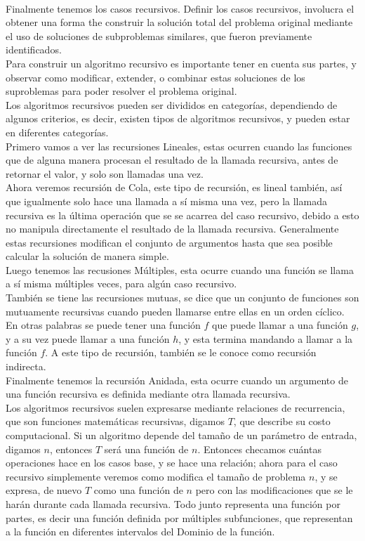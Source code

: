 \documentclass[12pt,twoside]{article}
\begin{document}
\newline
\\ Finalmente tenemos los casos recursivos. Definir los casos recursivos, involucra el obtener una forma the construir la solución total del problema original mediante el uso de soluciones de subproblemas similares, que fueron previamente identificados.
\\ Para construir un algoritmo recursivo es importante tener en cuenta sus partes, y observar como modificar, extender, o combinar estas soluciones de los suproblemas para poder resolver el problema original.
\newline
\\ Los algoritmos recursivos pueden ser divididos en categorías, dependiendo de algunos criterios, es decir, existen tipos de algoritmos recursivos, y pueden estar en diferentes categorías.
\\ Primero vamos a ver las recursiones Lineales, estas ocurren cuando las funciones que de alguna manera procesan el resultado de la llamada recursiva, antes de retornar el valor, y solo son llamadas una vez.
\\ Ahora veremos recursión de Cola, este tipo de recursión, es lineal también, así que igualmente solo hace una llamada a sí misma una vez, pero la llamada recursiva es la última operación que se se acarrea del caso recursivo, debido a esto no manipula directamente el resultado de la llamada recursiva. Generalmente estas recursiones modifican el conjunto de argumentos hasta que sea posible calcular la solución de manera simple.
\\ Luego tenemos las recusiones Múltiples, esta ocurre cuando una función se llama a sí misma múltiples veces, para algún caso recursivo.
\\ También se tiene las recursiones mutuas, se dice que un conjunto de funciones son mutuamente recursivas cuando pueden llamarse entre ellas en un orden cíclico. En otras palabras se puede tener una función $f$ que puede llamar a una función $g$, y a su vez puede llamar a una función $h$, y esta termina mandando a llamar a la función $f$. A este tipo de recursión, también se le conoce como recursión indirecta.
\\ Finalmente tenemos la recursión Anidada, esta ocurre cuando un argumento de una función recursiva es definida mediante otra llamada recursiva.
\newline
\\ Los algoritmos recursivos suelen expresarse mediante relaciones de recurrencia, que son funciones matemáticas recursivas, digamos $T$, que describe su costo computacional. Si un algoritmo depende del tamaño de un parámetro de entrada, digamos $n$, entonces $T$ será una función de $n$. Entonces checamos cuántas operaciones hace en los casos base, y se hace una relación; ahora para el caso recursivo simplemente veremos como modifica el tamaño de problema $n$, y se expresa, de nuevo $T$ como una función de $n$ pero con las modificaciones que se le harán durante cada llamada recursiva. Todo junto representa una función por partes, es decir una función definida por múltiples subfunciones, que representan a la función en diferentes intervalos del Dominio de la función.
\end{document}
